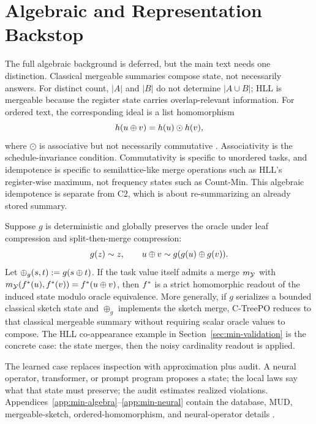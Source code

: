 \section{Algebraic and Representation Backstop}\label{sec:min-backstop}

The full algebraic background is deferred, but the main text needs one
distinction. Classical mergeable summaries compose state, not necessarily
answers. For distinct count, $|A|$ and $|B|$ do not determine
$|A\cup B|$; HLL is mergeable because the register state carries
overlap-relevant information. For ordered text, the corresponding ideal is a
list homomorphism
\[
h(u\oplus v)=h(u)\odot h(v),
\]
where $\odot$ is associative but not necessarily commutative
\citep{Gibbons1996ThirdHomomorphism}. Associativity is the schedule-invariance
condition. Commutativity is specific to unordered tasks, and idempotence is
specific to semilattice-like merge operations such as HLL's register-wise
maximum, not frequency states such as Count-Min. This algebraic idempotence is
separate from C2, which is about re-summarizing an already stored summary.

\begin{proposition}\label{prop:mergeable-reduction}
Suppose $g$ is deterministic and globally preserves the oracle under leaf
compression and split-then-merge compression:
\[
g(z)\sim z,\qquad
u\oplus v\sim g(g(u)\oplus g(v)).
\]
Let $\oplus_g(s,t):=g(s\oplus t)$. If the task value itself admits a merge
$m_{\mathcal{Y}}$ with
$m_{\mathcal{Y}}(f^\ast(u),f^\ast(v))=f^\ast(u\oplus v)$, then $f^\ast$ is a strict
homomorphic readout of the induced state modulo oracle equivalence. More
generally, if $g$ serializes a bounded classical sketch state and $\oplus_g$
implements the sketch merge, C-TreePO reduces to that classical mergeable
summary without requiring scalar oracle values to compose. The HLL
co-appearance example in Section~\ref{sec:min-validation} is the concrete
case: the state merges, then the noisy cardinality readout is applied.
\end{proposition}

The learned case replaces inspection with approximation plus audit. A neural
operator, transformer, or prompt program proposes a state; the local laws say
what that state must preserve; the audit estimates realized violations.
Appendices~\ref{app:min-algebra}--\ref{app:min-neural} contain the database,
MUD, mergeable-sketch, ordered-homomorphism, and neural-operator details
\citep{GrayEtAl1997DataCube,FeldmanEtAl2008MUD,Agarwal2013MergeableTODS}.
